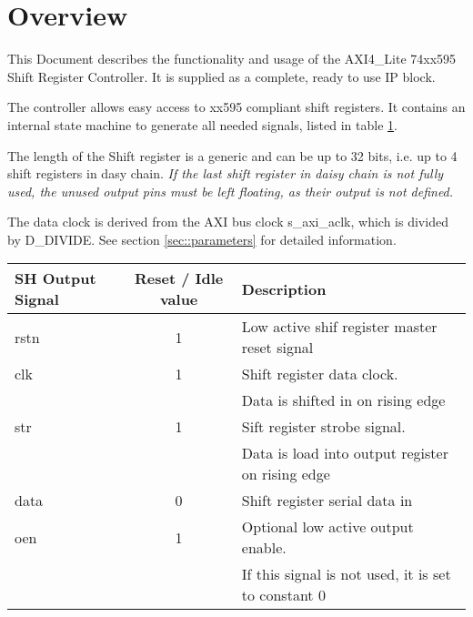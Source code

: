 


\maketitle

\section{Overview}
This Document describes the functionality and usage of the AXI4\_Lite 74xx595 Shift Register Controller.
It is supplied as a complete, ready to use IP block.

The controller allows easy access to xx595 compliant shift registers.
It contains an internal state machine to generate all needed signals, listed in table \ref{tbl::signals}.

The length of the Shift register is a generic and can be up to 32 bits, i.e. up to 4 shift registers in dasy chain.
\emph{If the last shift register in daisy chain is not fully used, the unused output pins must be left floating, as their output is not defined.}

The data clock is derived from the AXI bus clock s\_axi\_aclk, which is divided by D\_DIVIDE.
See section \ref{sec::parameters} for detailed information.

\begin{table}[htbp]
	
	\label{tbl::signals}
	\begin{tabular}{|l|c|l|}
		\hline 
		SH Output Signal & Reset / Idle value & Description \\ 
		\hline 
		rstn & 1 & Low active shif register master reset signal \\ 
		\hline 
		clk & 1 & Shift register data clock. \\
		& & Data is shifted in on rising edge \\ 
		\hline 
		str & 1 & Sift register strobe signal. \\
		 & & Data is load into output register on rising edge\\ 
		\hline 
		data & 0 & Shift register serial data in \\ 
		\hline 
		oen & 1 & Optional low active output enable. \\
		& & If this signal is not used, it is set to constant 0 \\ 
		\hline 
	\end{tabular} 

\end{table}


